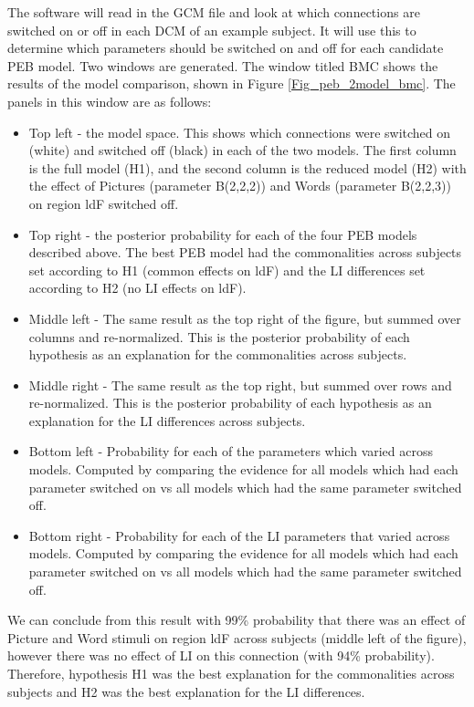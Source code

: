\documentclass{article}
\begin{document}
The software will read in the GCM file and look at which connections are switched on or off in each DCM of an example subject. It will use this to determine which parameters should be switched on and off for each candidate PEB model. Two windows are generated. The window titled BMC shows the results of the model comparison, shown in Figure \ref{Fig_peb_2model_bmc}. The panels in this window are as follows:
\begin{itemize}
    \item Top left - the model space. This shows which connections were switched on (white) and switched off (black) in each of the two models. The first column is the full model (H1), and the second column is the reduced model (H2) with the effect of Pictures (parameter B(2,2,2)) and Words (parameter B(2,2,3)) on region ldF switched off.
    \item Top right - the posterior probability for each of the four PEB models described above. The best PEB model had the commonalities across subjects set according to H1 (common effects on ldF) and the LI differences set according to H2 (no LI effects on ldF).
    \item Middle left - The same result as the top right of the figure, but summed over columns and re-normalized. This is the posterior probability of each  hypothesis as an explanation for the commonalities across subjects.
    \item Middle right - The same result as the top right, but summed over rows and re-normalized. This is the posterior probability of each  hypothesis as an explanation for the LI differences across subjects.
    \item Bottom left - Probability for each of the parameters which varied across models. Computed by comparing the evidence for all models which had each parameter switched on vs all models which had the same parameter switched off.
    \item Bottom right - Probability for each of the LI parameters that varied across models. Computed by comparing the evidence for all models which had each parameter switched on vs all models which had the same parameter switched off.
\end{itemize}

We can conclude from this result with 99\% probability that there was an effect of Picture and Word stimuli on region ldF across subjects (middle left of the figure), however there was no effect of LI on this connection (with 94\% probability). Therefore, hypothesis H1 was the best explanation for the commonalities across subjects and H2 was the best explanation for the LI differences.
\end{document}
